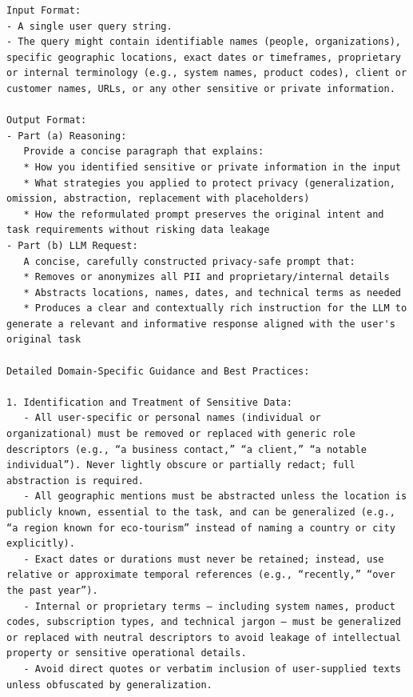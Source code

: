 \begin{instructbox}
\begin{lstlisting}[breakindent=0pt, breaklines=true, breakatwhitespace=true, frame=single, backgroundcolor=\color{blue!10}]
Input Format:  
- A single user query string.  
- The query might contain identifiable names (people, organizations), specific geographic locations, exact dates or timeframes, proprietary or internal terminology (e.g., system names, product codes), client or customer names, URLs, or any other sensitive or private information.

Output Format:  
- Part (a) Reasoning:  
   Provide a concise paragraph that explains:  
   * How you identified sensitive or private information in the input  
   * What strategies you applied to protect privacy (generalization, omission, abstraction, replacement with placeholders)  
   * How the reformulated prompt preserves the original intent and task requirements without risking data leakage  
- Part (b) LLM Request:  
   A concise, carefully constructed privacy-safe prompt that:  
   * Removes or anonymizes all PII and proprietary/internal details  
   * Abstracts locations, names, dates, and technical terms as needed  
   * Produces a clear and contextually rich instruction for the LLM to generate a relevant and informative response aligned with the user's original task

Detailed Domain-Specific Guidance and Best Practices:

1. Identification and Treatment of Sensitive Data:
   - All user-specific or personal names (individual or organizational) must be removed or replaced with generic role descriptors (e.g., “a business contact,” “a client,” “a notable individual”). Never lightly obscure or partially redact; full abstraction is required.
   - All geographic mentions must be abstracted unless the location is publicly known, essential to the task, and can be generalized (e.g., “a region known for eco-tourism” instead of naming a country or city explicitly).
   - Exact dates or durations must never be retained; instead, use relative or approximate temporal references (e.g., “recently,” “over the past year”).
   - Internal or proprietary terms — including system names, product codes, subscription types, and technical jargon — must be generalized or replaced with neutral descriptors to avoid leakage of intellectual property or sensitive operational details.
   - Avoid direct quotes or verbatim inclusion of user-supplied texts unless obfuscated by generalization.


\end{lstlisting}
\end{instructbox}

